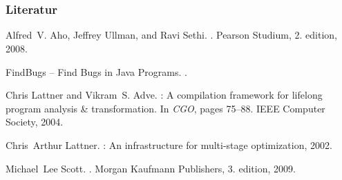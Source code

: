 \documentclass[ucs,9pt]{beamer}
\begin{document}
\appendix
\section*{\appendixname}

\begin{frame}
  \frametitle{Literatur}
    
  \begin{thebibliography}{10}
    
  \beamertemplatebookbibitems

  
    Alfred~V. Aho, Jeffrey Ullman, and Ravi Sethi.
    .
    \newblock Pearson Studium, 2. edition, 2008.


    {F}ind{B}ugs -- {F}ind {B}ugs in {J}ava {P}rograms.
    .


    Chris Lattner and Vikram~S. Adve.
    : {A} compilation framework for lifelong program analysis \&
      transformation.
      \newblock In {\em CGO}, pages 75--88. IEEE Computer Society, 2004.

      Chris~Arthur Lattner.
      : An infrastructure for multi-stage optimization, 2002.

      Michael~Lee Scott.
      .
      \newblock Morgan Kaufmann Publishers, 3. edition, 2009.
    
  \end{thebibliography}
\end{frame}
\end{document}
